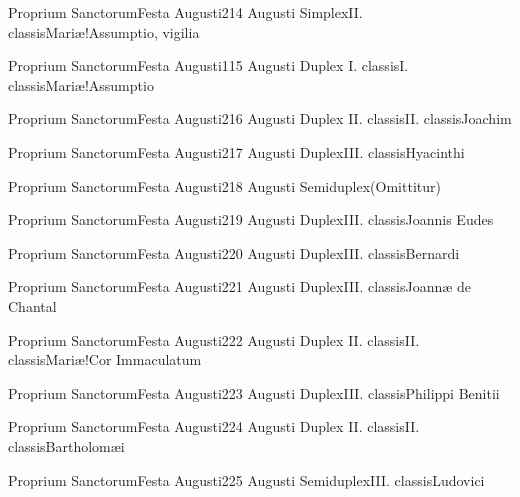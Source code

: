 \documentclass[invitatoriale-romanum.tex]{subfiles}
\begin{document}
	{Proprium Sanctorum}{Festa Augusti}{2}{14 Augusti}
	{Simplex}{II. classis}{Mariæ!Assumptio, vigilia}
	{}
	{}
\invitferia

	{Proprium Sanctorum}{Festa Augusti}{1}{15 Augusti}
	{Duplex I. classis}{I. classis}{Mariæ!Assumptio}
	{}
	{}

	{Proprium Sanctorum}{Festa Augusti}{2}{16 Augusti}
	{Duplex II. classis}{II. classis}{Joachim}
	{}
	{}

	{Proprium Sanctorum}{Festa Augusti}{2}{17 Augusti}
	{Duplex}{III. classis}{Hyacinthi}
	{}
	{}

	{Proprium Sanctorum}{Festa Augusti}{2}{18 Augusti}
	{Semiduplex}{(Omittitur)}{}
	{}
	{\invitferia}

	{Proprium Sanctorum}{Festa Augusti}{2}{19 Augusti}
	{Duplex}{III. classis}{Joannis Eudes}
	{}
	{}

	{Proprium Sanctorum}{Festa Augusti}{2}{20 Augusti}
	{Duplex}{III. classis}{Bernardi}
	{}
	{}

	{Proprium Sanctorum}{Festa Augusti}{2}{21 Augusti}
	{Duplex}{III. classis}{Joannæ de Chantal}
	{}
	{}

	{Proprium Sanctorum}{Festa Augusti}{2}{22 Augusti}
	{Duplex II. classis}{II. classis}{Mariæ!Cor Immaculatum}
	{}
	{}

	{Proprium Sanctorum}{Festa Augusti}{2}{23 Augusti}
	{Duplex}{III. classis}{Philippi Benitii}
	{}
	{}

	{Proprium Sanctorum}{Festa Augusti}{2}{24 Augusti}
	{Duplex II. classis}{II. classis}{Bartholomæi}
	{}
	{}

	{Proprium Sanctorum}{Festa Augusti}{2}{25 Augusti}
	{Semiduplex}{III. classis}{Ludovici}
	{}
	{}
\end{document}
